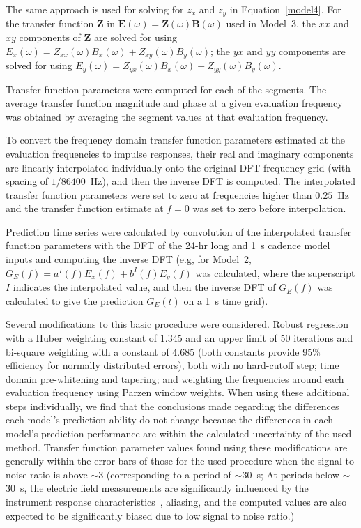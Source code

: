 \documentclass[draft,linenumbers]{agujournal2018}
\begin{document}
The same approach is used for solving for $z_x$ and $z_y$ in Equation~\ref{model4}. For the transfer function $\boldsymbol{Z}$ in $\mathbf{E}(\omega) = \boldsymbol{Z}(\omega)\mathbf{B}(\omega)$ used in Model~3, the $xx$ and $xy$ components of $\boldsymbol{Z}$ are solved for using $E_x(\omega) = Z_{xx}(\omega)B_x(\omega) + Z_{xy}(\omega)B_{y}(\omega)$; the $yx$ and $yy$ components are solved for using $E_y(\omega) = Z_{yx}(\omega)B_x(\omega) + Z_{yy}(\omega)B_y(\omega)$.

Transfer function parameters were computed for each of the segments. The average transfer function magnitude and phase at a given evaluation frequency was obtained by averaging the segment values at that evaluation frequency.

To convert the frequency domain transfer function parameters estimated at the evaluation frequencies to impulse responses, their real and imaginary components are linearly interpolated individually onto the original DFT frequency grid (with spacing of $1/86400$~Hz), and then the inverse DFT is computed. The interpolated transfer function parameters were set to zero at frequencies higher than $0.25$~Hz and the transfer function estimate at $f=0$ was set to zero before interpolation.

Prediction time series were calculated by convolution of the interpolated transfer function parameters with the DFT of the 24-hr long and 1~s cadence model inputs and computing the inverse DFT (e.g, for Model~2, $G_E(f)=a^I(f)E_x(f)+b^I(f)E_y(f)$ was calculated, where the superscript $I$ indicates the interpolated value, and then the inverse DFT of $G_E(f)$ was calculated to give the prediction $G_E(t)$ on a 1~s time grid).

Several modifications to this basic procedure were considered. Robust regression \citep{Egbert1986} with a Huber weighting constant of $1.345$ and an upper limit of 50 iterations and bi-square weighting with a constant of $4.685$ (both constants provide 95\% efficiency for normally distributed errors), both with no hard-cutoff step; time domain pre-whitening and tapering; and weighting the frequencies around each evaluation frequency using Parzen window weights. When using these additional steps individually, we find that the conclusions made regarding the differences each model's prediction ability do not change because the differences in each model's prediction performance are within the calculated uncertainty of the used method. Transfer function parameter values found using these modifications are generally within the error bars of those for the used procedure when the signal to noise ratio is above $\sim$3 (corresponding to a period of $\sim 30$~s; At periods below $\sim$30~s, the electric field measurements are significantly influenced by the instrument response characteristics~\citep{Fujii2015}, aliasing, and the computed values are also expected to be significantly biased due to low signal to noise ratio.)
\end{document}
